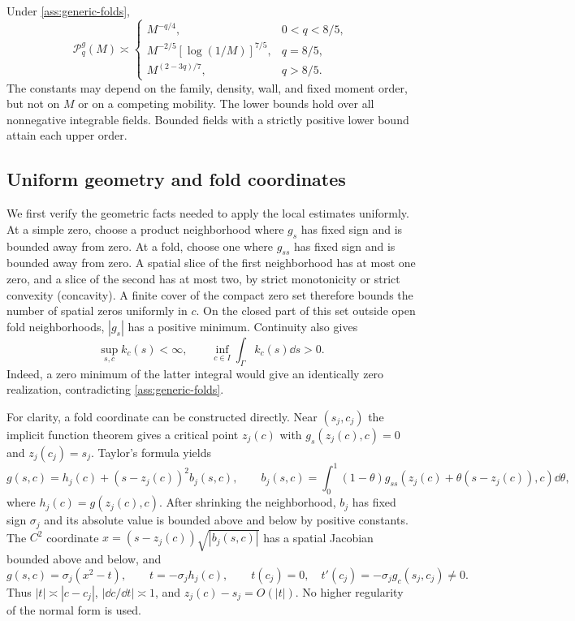 \begin{theorem}\label{thm:generic-orders}
Under \cref{ass:generic-folds},
\begin{equation}\label{eq:generic-three}
 \mathcal P_q^g(M)\asymp
 \begin{cases}
 M^{-q/4},&0<q<8/5,\\
 M^{-2/5}[\log(1/M)]^{7/5},&q=8/5,\\
 M^{(2-3q)/7},&q>8/5.
 \end{cases}
\end{equation}
The constants may depend on the family, density, wall, and fixed moment
order, but not on $M$ or on a competing mobility. The lower bounds
hold over all nonnegative integrable fields. Bounded fields with a
strictly positive lower bound attain each upper order.
\end{theorem}

\subsection{Uniform geometry and fold coordinates}
We first verify the geometric facts needed to apply the local estimates
uniformly. At a simple zero, choose a product neighborhood where $g_s$
has fixed sign and is bounded away from zero. At a fold, choose one
where $g_{ss}$ has fixed sign and is bounded away from zero. A spatial
slice of the first neighborhood has at most one zero, and a slice of
the second has at most two, by strict monotonicity or strict convexity
(concavity). A finite cover of the compact zero set therefore bounds
the number of spatial zeros uniformly in $c$. On the closed part of
this set outside open fold neighborhoods, $|g_s|$ has a positive minimum.
Continuity also gives
\begin{equation}\label{eq:generic-anchor}
 \sup_{s,c} k_c(s)<\infty,\qquad
 \inf_{c\in I}\int_\Gamma k_c(s)\dd s>0.
\end{equation}
Indeed, a zero minimum of the latter integral would give an identically
zero realization, contradicting \cref{ass:generic-folds}.

For clarity, a fold coordinate can be constructed directly. Near
$(s_j,c_j)$ the implicit function theorem gives a critical point $z_j(c)$
with $g_s(z_j(c),c)=0$ and $z_j(c_j)=s_j$. Taylor's formula yields
\[
 g(s,c)=h_j(c)+(s-z_j(c))^2b_j(s,c),\qquad
 b_j(s,c)=\int_0^1(1-\theta)
 g_{ss}(z_j(c)+\theta(s-z_j(c)),c)\dd\theta,
\]
where $h_j(c)=g(z_j(c),c)$. After shrinking the neighborhood,
$b_j$ has fixed sign $\sigma_j$ and its absolute value is bounded
above and below by positive constants. The $C^2$ coordinate
$x=(s-z_j(c))\sqrt{|b_j(s,c)|}$ has a spatial Jacobian bounded
above and below, and
\begin{equation}\label{eq:generic-normal-form}
 g(s,c)=\sigma_j(x^2-t),\qquad t=-\sigma_j h_j(c),\qquad
 t(c_j)=0,\quad t'(c_j)=-\sigma_j g_c(s_j,c_j)\ne0.
\end{equation}
Thus $|t|\asymp|c-c_j|$, $|\dd c/\dd t|\asymp1$,
and $z_j(c)-s_j=O(|t|)$. No higher regularity of the normal form is used.

